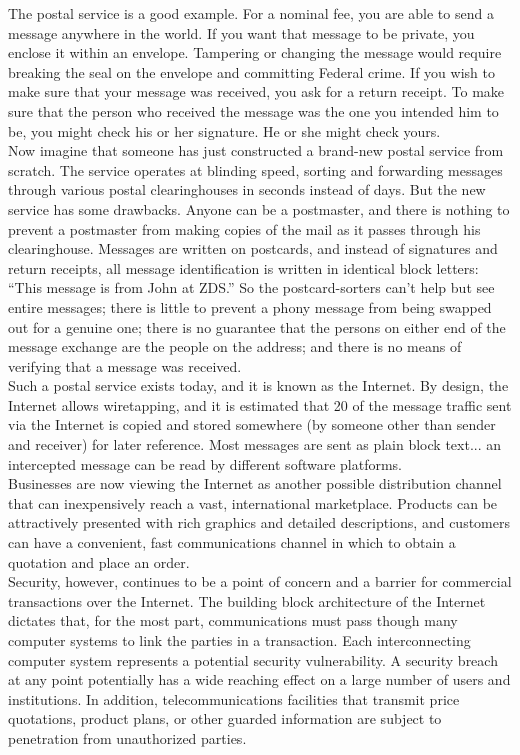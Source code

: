 The postal service is a good example. For a nominal fee, you are able
to send a message anywhere in the world. If you want that message to be
private, you enclose it within an envelope. Tampering or changing the
message would require breaking the seal on the envelope and committing
Federal crime. If you wish to make sure that your message was received,
you ask for a return receipt. To make sure that the person who received
the message was the one you intended him to be, you might check his or
her signature. He or she might check yours.\\

Now imagine that someone has just constructed a brand-new postal
service from scratch. The service operates at blinding speed, sorting
and forwarding messages through various postal clearinghouses in
seconds instead of days. But the new service has some drawbacks. Anyone
can be a postmaster, and there is nothing to prevent a postmaster from
making copies of the mail as it passes through his clearinghouse.
Messages are written on postcards, and instead of signatures and return
receipts, all message identification is written in identical block
letters: ``This message is from John at ZDS.'' So the postcard-sorters
can't help but see entire messages; there is little to prevent a phony
message from being swapped out for a genuine one; there is no guarantee
that the persons on either end of the message exchange are the people
on the address; and there is no means of verifying that a message was
received.\\

Such a postal service exists today, and it is known as the Internet. By
design, the Internet allows wiretapping, and it is estimated that 20%
of the message traffic sent via the Internet is copied and stored
somewhere (by someone other than sender and receiver) for later
reference. Most messages are sent as plain block text... an intercepted
message can be read by different software platforms.\\

Businesses are now viewing the Internet as another possible
distribution channel that can inexpensively reach a vast, international
marketplace. Products can be attractively presented with rich graphics
and detailed descriptions, and customers can have a convenient, fast
communications channel in which to obtain a quotation and place an
order.\\

Security, however, continues to be a point of concern and a barrier for
commercial transactions over the Internet. The building block
architecture of the Internet dictates that, for the most part,
communications must pass though many computer systems to link the
parties in a transaction. Each interconnecting computer system
represents a potential security vulnerability. A security breach at any
point potentially has a wide reaching effect on a large number of users
and institutions. In addition, telecommunications facilities that
transmit price quotations, product plans, or other guarded information
are subject to penetration from unauthorized parties.\\


